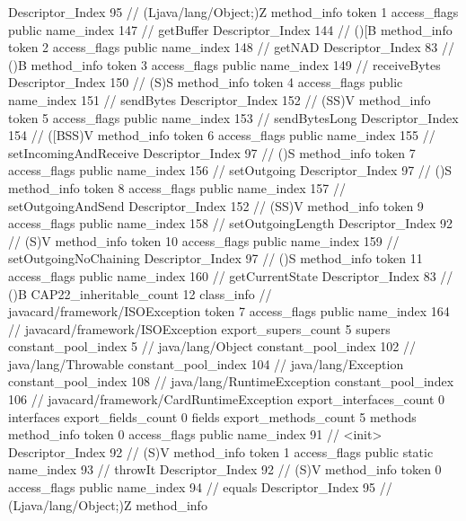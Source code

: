 {{{{{					Descriptor_Index	95		// (Ljava/lang/Object;)Z
				}
				method_info {
					token	1
					access_flags	public
					name_index	147		// getBuffer
					Descriptor_Index	144		// ()[B
				}
				method_info {
					token	2
					access_flags	public
					name_index	148		// getNAD
					Descriptor_Index	83		// ()B
				}
				method_info {
					token	3
					access_flags	public
					name_index	149		// receiveBytes
					Descriptor_Index	150		// (S)S
				}
				method_info {
					token	4
					access_flags	public
					name_index	151		// sendBytes
					Descriptor_Index	152		// (SS)V
				}
				method_info {
					token	5
					access_flags	public
					name_index	153		// sendBytesLong
					Descriptor_Index	154		// ([BSS)V
				}
				method_info {
					token	6
					access_flags	public
					name_index	155		// setIncomingAndReceive
					Descriptor_Index	97		// ()S
				}
				method_info {
					token	7
					access_flags	public
					name_index	156		// setOutgoing
					Descriptor_Index	97		// ()S
				}
				method_info {
					token	8
					access_flags	public
					name_index	157		// setOutgoingAndSend
					Descriptor_Index	152		// (SS)V
				}
				method_info {
					token	9
					access_flags	public
					name_index	158		// setOutgoingLength
					Descriptor_Index	92		// (S)V
				}
				method_info {
					token	10
					access_flags	public
					name_index	159		// setOutgoingNoChaining
					Descriptor_Index	97		// ()S
				}
				method_info {
					token	11
					access_flags	public
					name_index	160		// getCurrentState
					Descriptor_Index	83		// ()B
				}
			}
			CAP22_inheritable_count	12
		}
		class_info {		// javacard/framework/ISOException
			token	7
			access_flags	public
			name_index	164		// javacard/framework/ISOException
			export_supers_count	5
			supers {
				constant_pool_index	5		// java/lang/Object
				constant_pool_index	102		// java/lang/Throwable
				constant_pool_index	104		// java/lang/Exception
				constant_pool_index	108		// java/lang/RuntimeException
				constant_pool_index	106		// javacard/framework/CardRuntimeException
			}
			export_interfaces_count	0
			interfaces {
			}
			export_fields_count	0
			fields {
			}
			export_methods_count	5
			methods {
				method_info {
					token	0
					access_flags	public
					name_index	91		// <init>
					Descriptor_Index	92		// (S)V
				}
				method_info {
					token	1
					access_flags	public static
					name_index	93		// throwIt
					Descriptor_Index	92		// (S)V
				}
				method_info {
					token	0
					access_flags	public
					name_index	94		// equals
					Descriptor_Index	95		// (Ljava/lang/Object;)Z
				}
				method_info {
}}}}}
